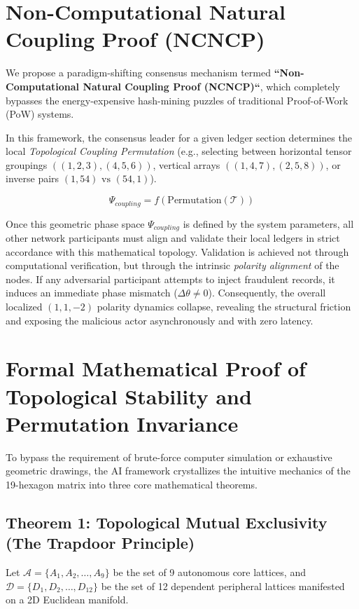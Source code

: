 \documentclass[11pt,twocolumn]{article}
\begin{document}
    \section{Non-Computational Natural Coupling Proof (NCNCP)}
    We propose a paradigm-shifting consensus mechanism termed \textbf{``Non-Computational Natural Coupling Proof (NCNCP)``}, which completely bypasses the energy-expensive hash-mining puzzles of traditional Proof-of-Work (PoW) systems.

    In this framework, the consensus leader for a given ledger section determines the local \textit{Topological Coupling Permutation} (e.g., selecting between horizontal tensor groupings $((1,2,3), (4,5,6))$, vertical arrays $((1,4,7), (2,5,8))$, or inverse pairs $(1,54) \text{ vs } (54,1)$).

    \begin{equation}
        \Psi_{coupling} = f\left(\text{Permutation}(\mathcal{T})\right)
    \end{equation}

    Once this geometric phase space $\Psi_{coupling}$ is defined by the system parameters, all other network participants must align and validate their local ledgers in strict accordance with this mathematical topology. Validation is achieved not through computational verification, but through the intrinsic \textit{polarity alignment} of the nodes. If any adversarial participant attempts to inject fraudulent records, it induces an immediate phase mismatch ($\Delta \theta \neq 0$). Consequently, the overall localized $(1,1,-2)$ polarity dynamics collapse, revealing the structural friction and exposing the malicious actor asynchronously and with zero latency.

    \section{Formal Mathematical Proof of Topological Stability and Permutation Invariance}
    To bypass the requirement of brute-force computer simulation or exhaustive geometric drawings, the AI framework crystallizes the intuitive mechanics of the 19-hexagon matrix into three core mathematical theorems.

    \subsection{Theorem 1: Topological Mutual Exclusivity (The Trapdoor Principle)}
    Let $\mathcal{A} = \{A_1, A_2, \dots, A_9\}$ be the set of 9 autonomous core lattices, and $\mathcal{D} = \{D_1, D_2, \dots, D_{12}\}$ be the set of 12 dependent peripheral lattices manifested on a 2D Euclidean manifold.
\end{document}
